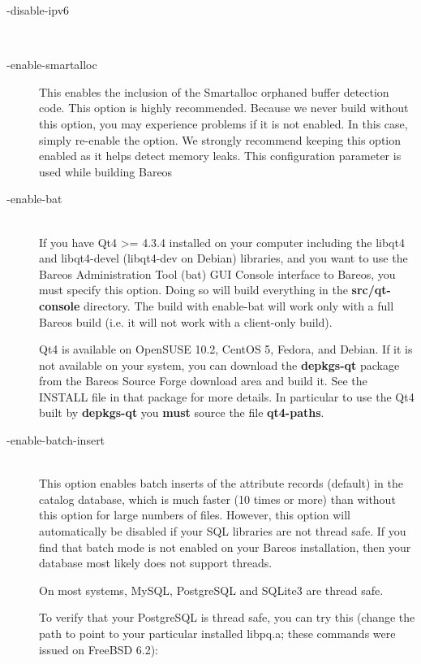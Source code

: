 \begin{description}
\item [ {-}{\-}disable-ipv6] \hfill \\

\item [ {-}{\-}enable-smartalloc]
This enables the inclusion of the Smartalloc orphaned buffer detection
code.  This option is highly recommended.  Because we never build
without this option, you may experience problems if it is not enabled.
In this case, simply re-enable the option.  We strongly recommend
keeping this option enabled as it helps detect memory leaks.  This
configuration parameter is used while building Bareos

\item [ {-}{\-}enable-bat] \hfill \\
\label{enablebat}
If you have Qt4 >= 4.3.4 installed on your computer including the
libqt4 and libqt4-devel (libqt4-dev on Debian) libraries, and you want
to use the Bareos Administration Tool (bat) GUI Console interface to
Bareos, you must specify this option.  Doing so will build everything in
the {\bf src/qt-console} directory.  The build with enable-bat will work
only with a full Bareos build (i.e. it will not work with a client-only
build).

Qt4 is available on OpenSUSE 10.2, CentOS 5, Fedora, and Debian. If it
is not available on your system, you can download the {\bf depkgs-qt}
package from the Bareos Source Forge download area and build it.
See the INSTALL file in that package for more details. In particular
to use the Qt4 built by {\bf depkgs-qt} you {\bf must} source the file
{\bf qt4-paths}.

\item [ {-}{\-}enable-batch-insert] \hfill \\
This option enables batch inserts of the attribute records (default) in
the catalog database, which is much faster (10 times or more) than
without this option for large numbers of files. However, this option
will automatically be disabled if your SQL libraries are not
thread safe. If you find that batch mode is not enabled on your Bareos
installation, then your database most likely does not support threads.

On most systems, MySQL, PostgreSQL and SQLite3 are thread safe.

To verify that your PostgreSQL is thread safe, you can try this
(change the path to point to your particular installed libpq.a;
these commands were issued on FreeBSD 6.2):


\end{description}
